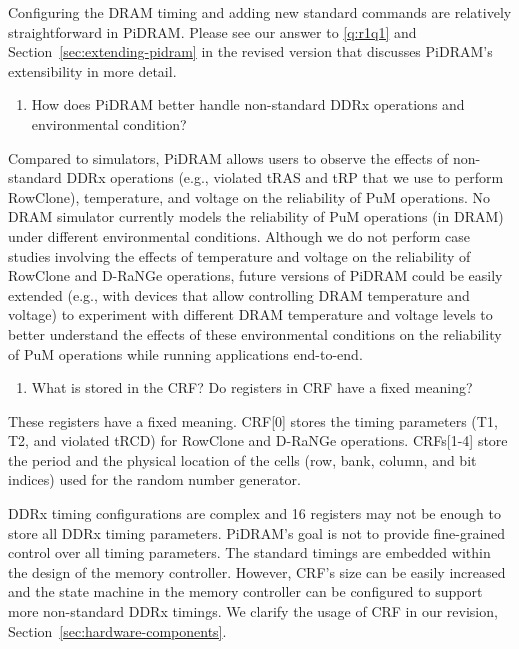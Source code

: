 Configuring the DRAM timing and adding new standard commands are relatively straightforward in PiDRAM. Please see our answer to \ref{q:r1q1} and Section~\ref{sec:extending-pidram} in the revised version that discusses PiDRAM's extensibility in more detail.

\bigbreak
\begin{tcolorbox}
    \begin{enumerate}[label=R3/\arabic*]
       \addtocounter{enumi}{4}
        \item \label{q:r3q5} How does PiDRAM better handle non-standard DDRx operations and environmental condition?
    \end{enumerate}
\end{tcolorbox} 

Compared to simulators, PiDRAM allows users to observe the effects of non-standard DDRx operations (e.g., violated tRAS and tRP that we use to perform RowClone), temperature, and voltage on the reliability of PuM operations. No DRAM simulator currently models the reliability of PuM operations (in DRAM) under different environmental conditions. Although we do not perform case studies involving the effects of temperature and voltage on the reliability of RowClone and D-RaNGe operations, future versions of PiDRAM could be easily extended (e.g., with devices that allow controlling DRAM temperature and voltage) to experiment with different DRAM temperature and voltage levels to better understand the effects of these environmental conditions on the reliability of PuM operations while running applications end-to-end. 

\bigbreak
\begin{tcolorbox}
    \begin{enumerate}[label=R3/\arabic*]
       \addtocounter{enumi}{5}
        \item \label{q:r3q6} What is stored in the CRF? Do registers in CRF have a fixed meaning?
    \end{enumerate}
\end{tcolorbox} 

These registers have a fixed meaning. CRF[0] stores the timing parameters (T1, T2, and violated tRCD) for RowClone and D-RaNGe operations. CRFs[1-4] store the period and the physical location of the cells (row, bank, column, and bit indices) used for the random number generator. 

DDRx timing configurations are complex and 16 registers may not be enough to store all DDRx timing parameters. PiDRAM's goal is not to provide fine-grained control over all timing parameters. The standard timings are embedded within the design of the memory controller. However, CRF’s size can be easily increased and the state machine in the memory controller can be configured to support more non-standard DDRx timings. We clarify the usage of CRF in our revision, Section~\ref{sec:hardware-components}.

